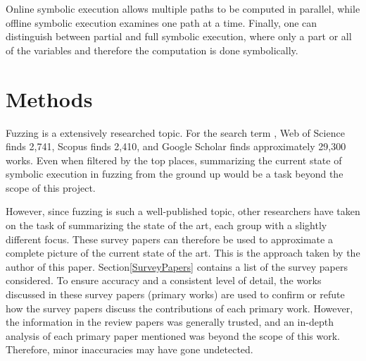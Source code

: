 \documentclass{article}
\begin{document}
\begin{multicols}{2}
    Online symbolic execution allows multiple paths to be computed in parallel, while offline symbolic execution examines one path at a time. Finally, one can distinguish between partial and full symbolic execution, where only a part or all of the variables and therefore the computation is done symbolically.\cite{Ghidrion}

    \section{Methods}
    \label{Methods}

    Fuzzing is a extensively researched topic. For the search term , Web of Science\cite{WebOfScience} finds 2,741, Scopus\cite{Scopus} finds 2,410, and Google Scholar\cite{GoogleScholar} finds approximately 29,300 works. Even when filtered by the top places, summarizing the current state of symbolic execution in fuzzing from the ground up would be a task beyond the scope of this project.

    However, since fuzzing is such a well-published topic, other researchers have taken on the task of summarizing the state of the art, each group with a slightly different focus. These survey papers can therefore be used to approximate a complete picture of the current state of the art. This is the approach taken by the author of this paper. Section\ref{SurveyPapers} contains a list of the survey papers considered. To ensure accuracy and a consistent level of detail, the works discussed in these survey papers (primary works) are used to confirm or refute how the survey papers discuss the contributions of each primary work. However, the information in the review papers was generally trusted, and an in-depth analysis of each primary paper mentioned was beyond the scope of this work. Therefore, minor inaccuracies may have gone undetected.


\end{multicols}
\end{document}
